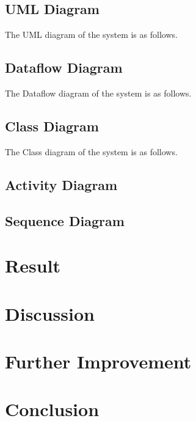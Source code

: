 \documentclass[a4paper,12pt,onepage]{article}
\begin{document}
\subsection{UML Diagram}
The UML diagram of the system is as follows.

\newpage
\subsection{Dataflow Diagram}
The Dataflow diagram of the system is as follows.

\newpage
\subsection{Class Diagram}\par
The Class diagram of the system is as follows.

\newpage
\subsection{Activity Diagram}
\newpage
\subsection{Sequence Diagram}
\newpage

\section{Result}
\newpage
\section{Discussion}

\newpage
\section{Further Improvement}

\newpage
\section{Conclusion}

\newpage


\nocite{*}
\end{document}
